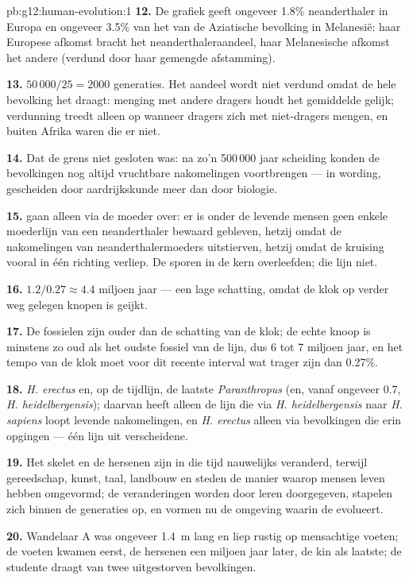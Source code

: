 \begin{solution}{pb:g12:human-evolution:1}
\textbf{12.} De grafiek geeft ongeveer 1.8\% neanderthaler in Europa en
ongeveer 3.5\% van het  van de Aziatische bevolking in Melanesië: haar Europese afkomst
bracht het neanderthaleraandeel, haar Melanesische afkomst het andere
(verdund door haar gemengde afstamming).

\textbf{13.} $50\,000/25 = 2000$ generaties. Het aandeel wordt niet
verdund omdat de hele bevolking het draagt: menging met andere dragers
houdt het gemiddelde gelijk; verdunning treedt alleen op wanneer dragers
zich met niet-dragers mengen, en buiten Afrika waren die er niet.

\textbf{14.} Dat de grens niet gesloten was: na zo'n 500\,000 jaar
scheiding konden de bevolkingen nog altijd vruchtbare nakomelingen
voortbrengen ---  in wording, gescheiden door aardrijkskunde meer
dan door biologie.

\textbf{15.}  gaan alleen via de moeder over: er is onder de
levende mensen geen enkele moederlijn van een neanderthaler bewaard
gebleven, hetzij omdat de nakomelingen van neanderthalermoeders
uitstierven, hetzij omdat de kruising vooral in één richting verliep. De
sporen in de kern overleefden; die lijn niet.

\textbf{16.} $1.2/0.27 \approx 4.4$ miljoen jaar --- een lage schatting,
omdat de klok op verder weg gelegen knopen is geijkt.

\textbf{17.} De fossielen zijn ouder dan de schatting van de klok; de
echte knoop is minstens zo oud als het oudste fossiel van de lijn, dus 6
tot 7 miljoen jaar, en het tempo van de klok moet voor dit recente
interval wat trager zijn dan 0.27\%.

\textbf{18.} \emph{H. erectus} en, op de tijdlijn, de laatste
\emph{Paranthropus} (en, vanaf ongeveer 0.7, \emph{H. heidelbergensis});
daarvan heeft alleen de lijn die via \emph{H. heidelbergensis} naar
\emph{H. sapiens} loopt levende nakomelingen, en \emph{H. erectus} alleen
via bevolkingen die erin opgingen --- één lijn uit verscheidene.

\textbf{19.} Het skelet en de hersenen zijn in die tijd nauwelijks
veranderd, terwijl gereedschap, kunst, taal, landbouw en steden de manier
waarop mensen leven hebben omgevormd; de veranderingen worden door leren
doorgegeven, stapelen zich binnen de generaties op, en vormen nu de
omgeving waarin de  evolueert.

\textbf{20.} Wandelaar A was ongeveer \qty{1.4}{m} lang en liep rustig op
mensachtige voeten; de voeten kwamen eerst, de hersenen een miljoen jaar
later, de kin als laatste; de studente draagt  van twee uitgestorven
bevolkingen.
\end{solution}

